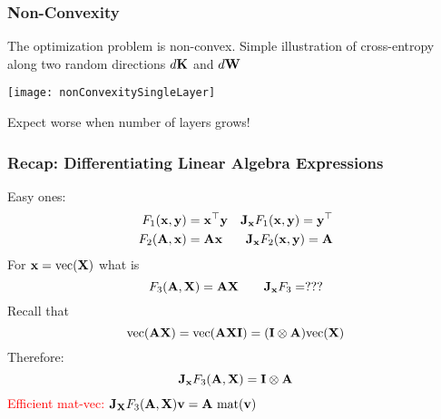 \documentclass[12pt,fleqn,handout]{beamer}
\begin{document}
\begin{frame}
	\frametitle{Non-Convexity}
	The optimization problem is non-convex. Simple illustration of cross-entropy along two random directions $d{\bf K}$ and $d{\bf W}$

	\begin{center}
		\texttt{[image: nonConvexitySingleLayer]}
		
	\bigskip
	
	Expect worse when number of layers grows!
	\end{center}

\end{frame}
%
%
%
%
%

\begin{frame}\frametitle{Recap: Differentiating Linear Algebra Expressions}

Easy ones:
\begin{align*}
 F_1({\bf x},{\bf y}) &= {\bf x}^{\top} {\bf y}  & {\bf J}_{{\bf x}}F_1({\bf x},{\bf y}) = {\bf y}^\top\\
F_2({\bf A},{\bf x})  &= {\bf A} {\bf x}         & {\bf J}_{{\bf x}}F_2({\bf x},{\bf y}) = {\bf A} 
\end{align*}
\pause
For ${\bf x} = {\rm vec}({\bf X})$ what is
$$ F_3({\bf A},{\bf X}) =   {\bf A}  {\bf X} \quad \quad {\bf J}_{{\bf x}} F_3 = ??? $$
\pause
Recall that
$${\rm vec}({\bf A} {\bf X}) = {\rm vec}({\bf A}  {\bf X} {\bf I}) = ({\bf I} \otimes {\bf A}) {\rm vec} ({\bf X}) $$
Therefore:
$$ {\bf J}_{{\bf x}}F_3({\bf A},{\bf X}) = {\bf I} \otimes {\bf A} $$
\pause
\textcolor{red}{
Efficient mat-vec: } ${\bf J}_{{\bf X}}F_3({\bf A},{\bf X}) {\bf v} = { {\bf A}\ \rm mat}({\bf v})$
	
\end{frame}
\end{document}
